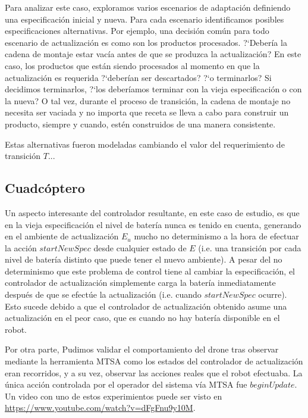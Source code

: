 Para analizar este caso, exploramos varios escenarios de adaptación definiendo una especificación inicial y nueva. Para
cada escenario identificamos posibles especificaciones alternativas. Por ejemplo, una decisión común para todo escenario
de actualización es como son los productos procesados. ?`Debería la cadena de montaje estar vacía antes de que se
produzca la actualización? En este caso, los productos que están siendo procesados al momento en que la actualización es
requerida ?`deberían ser descartados? ?`o terminarlos? Si decidimos terminarlos, ?`los deberíamos terminar con la vieja
especificación o con la nueva? O tal vez, durante el proceso de transición, la cadena de montaje no necesita ser vaciada
y no importa que receta se lleva a cabo para construir un producto, siempre y cuando, estén construidos de una manera
consistente. 

Estas alternativas fueron modeladas cambiando el valor del requerimiento de transición $T$...

\subsection{Cuadcóptero}

Un aspecto interesante del controlador resultante, en este caso de estudio, es que en la vieja especificación el nivel
de batería nunca es tenido en cuenta, generando en el ambiente de actualización $E_u$ mucho no determinismo a la hora de
efectuar la acción $startNewSpec$ desde cualquier estado de $E$ (i.e. una transición por cada nivel de batería distinto que
puede tener el nuevo ambiente). A pesar del no determinismo que este problema de control tiene al cambiar la
especificación, el controlador de actualización simplemente carga la batería inmediatamente después de que se efectúe la
actualización (i.e. cuando $startNewSpec$ ocurre). Esto sucede debido a que el controlador de actualización obtenido
asume una actualización en el peor caso, que es cuando no hay batería disponible en el robot.

Por otra parte, Pudimos validar el comportamiento del drone tras observar mediante la herramienta MTSA como los estados
del controlador de actualización eran recorridos, y a su vez, observar las acciones reales que el robot efectuaba. La
única acción controlada por el operador del sistema vía MTSA fue $beginUpdate$. Un video con uno de estos experimientos
puede ser visto en \url{https://www.youtube.com/watch?v=dFgFnu9y10M}.


